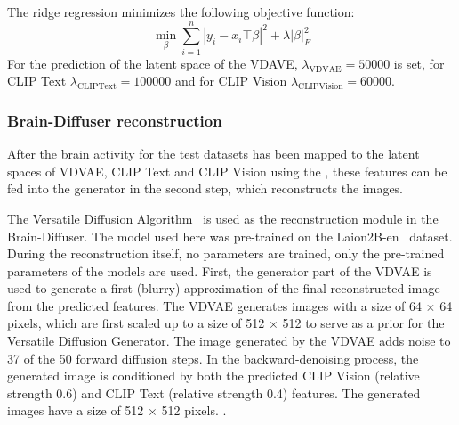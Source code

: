 The ridge regression minimizes the following objective function:
\[
\min_{\beta} \sum_{i=1}^{n} {|y_i - x_i\top \beta|}^2 + \lambda |\beta|^2_F
\]
\noindent{} For the prediction of the latent space of the VDAVE, $\lambda_{\mathrm{VDVAE}}=50000$ is set, for CLIP Text $\lambda_{\mathrm{CLIP Text}}=100000$ and for CLIP Vision $\lambda_{\mathrm{CLIP Vision}}=60000$.


\subsubsection{Brain-Diffuser reconstruction}
After the brain activity for the test datasets has been mapped to the latent spaces of VDVAE, CLIP Text and CLIP Vision using the , these  features can be fed into the generator in the second step, which reconstructs the images.

The Versatile Diffusion Algorithm~\cite{xuVersatileDiffusionText2024} is used as the reconstruction module in the Brain-Diffuser. The model used here was pre-trained on the Laion2B-en~\cite{schuhmannLAION400MOpenDataset2021} dataset. During the reconstruction itself, no parameters are trained, only the pre-trained parameters of the models are used. First, the generator part of the VDVAE is used to generate a first (blurry) approximation of the final reconstructed image from the predicted features. The VDVAE generates images with a size of 64 $\times$ 64 pixels, which are first scaled up to a size of 512 $\times$ 512 to serve as a prior for the Versatile Diffusion Generator. The image generated by the VDVAE adds noise to 37 of the 50 forward diffusion steps. In the backward-denoising process, the generated image is conditioned by both the predicted CLIP Vision (relative strength 0.6) and CLIP Text (relative strength 0.4) features. The generated images have a size of 512 $\times$ 512 pixels. .

